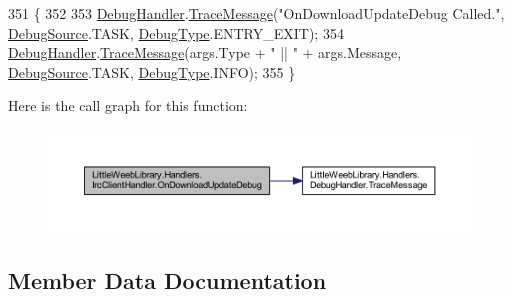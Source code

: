 \begin{DoxyCode}
351         \{
352 
353             \mbox{\hyperlink{class_little_weeb_library_1_1_handlers_1_1_irc_client_handler_ab50ece494948d25db1839f4d6eab038f}{DebugHandler}}.\mbox{\hyperlink{interface_little_weeb_library_1_1_handlers_1_1_i_debug_handler_a2e405bc3492e683cd3702fae125221bc}{TraceMessage}}(\textcolor{stringliteral}{"OnDownloadUpdateDebug Called."}, 
      \mbox{\hyperlink{namespace_little_weeb_library_1_1_handlers_a2a6ca0775121c9c503d58aa254d292be}{DebugSource}}.TASK, \mbox{\hyperlink{namespace_little_weeb_library_1_1_handlers_ab66019ed40462876ec4e61bb3ccb0a62}{DebugType}}.ENTRY\_EXIT);
354             \mbox{\hyperlink{class_little_weeb_library_1_1_handlers_1_1_irc_client_handler_ab50ece494948d25db1839f4d6eab038f}{DebugHandler}}.\mbox{\hyperlink{interface_little_weeb_library_1_1_handlers_1_1_i_debug_handler_a2e405bc3492e683cd3702fae125221bc}{TraceMessage}}(args.Type + \textcolor{stringliteral}{" || "} + args.Message, 
      \mbox{\hyperlink{namespace_little_weeb_library_1_1_handlers_a2a6ca0775121c9c503d58aa254d292be}{DebugSource}}.TASK, \mbox{\hyperlink{namespace_little_weeb_library_1_1_handlers_ab66019ed40462876ec4e61bb3ccb0a62}{DebugType}}.INFO);         
355         \}
\end{DoxyCode}
Here is the call graph for this function\+:\nopagebreak
\begin{figure}[H]
\begin{center}
\leavevmode
\includegraphics[width=350pt]{class_little_weeb_library_1_1_handlers_1_1_irc_client_handler_abdc8785a2452e7a1d496c44a424d1812_cgraph}
\end{center}
\end{figure}


\subsection{Member Data Documentation}
\mbox{\label{class_little_weeb_library_1_1_handlers_1_1_irc_client_handler_ac52cdf245955073d59f8193e167c149d}} 

